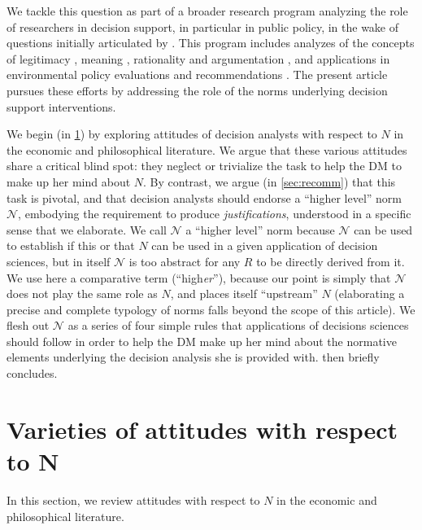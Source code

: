 \documentclass[preprint, french, english, 11pt, authoryear]{elsarticle}%
\newcommand{\protectforpdf}[1]{\texorpdfstring{\ensuremath{#1}}{#1}}
\newcommand{\adv}{\mathscr{N}}
\begin{document}
We tackle this question as part of a broader research program analyzing the role of researchers in decision support, in particular in public policy, in the wake of questions initially articulated by \citet{tsoukias_policy_2013}.
This program includes analyzes of the concepts of legitimacy \citep{meinard_what_2017}, meaning \citep{meinard_utility_2018}, rationality \citep{meinard_rationality_2019} and argumentation \citep{cailloux_formal_2018}, 
and applications in environmental policy evaluations \citep{jeanmougin_mismatch_2017} and recommendations \citep{choulak_meta-decision-analysis_2019}.
The present article pursues these efforts by addressing the role of the norms underlying decision support interventions.

We begin (in \cref{sec:existing}) by exploring attitudes of decision analysts with respect to $N$ in the economic and philosophical literature. 
We argue that these various attitudes share a critical blind spot: they neglect or trivialize the task to help the DM%
 to make up her mind about $N$. 
By contrast, we argue (in \cref{sec:recomm}) that this task is pivotal, and that decision analysts should endorse a “higher level” norm $\adv$, embodying the requirement to produce \emph{justifications}, understood in a specific sense that we elaborate. 
We call $\adv$ a “higher level” norm because $\adv$ can be used to establish if this or that $N$ can be used in a given application of decision sciences, but in itself $\adv$ is too abstract for any $R$ to be directly derived from it.
We use here a comparative term (“high\emph{er}”), because our point is simply that $\adv$ does not play the same role as $N$, and places itself “upstream” $N$ (elaborating a precise and complete typology of norms falls beyond the scope of this article).
We flesh out $\adv$ as a series of four simple rules that applications of decisions sciences should follow in order to help the DM%
 make up her mind about the normative elements underlying the decision analysis she is provided with.  then briefly concludes.

\section{Varieties of attitudes with respect to N}%
\label{sec:existing}
In this section, we review attitudes with respect to $N$ in the economic and philosophical literature.
\end{document}
